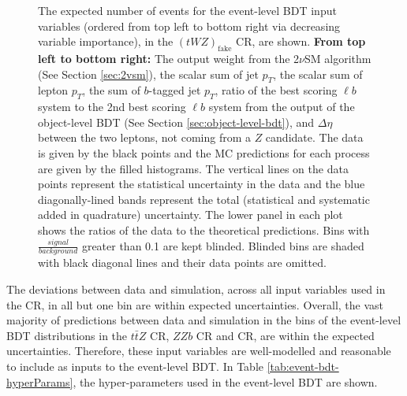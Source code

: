 \begin{figure}[htbp]
\caption{The expected number of events for the event-level BDT input variables (ordered from top left to bottom right via decreasing variable importance), in the $(tWZ)_{\text{fake}}$ CR, are shown. \textbf{From top left to bottom right:} The output weight from the 2$\nu$SM algorithm (See Section \ref{sec:2vsm}), the scalar sum of jet $p_{T}$, the scalar sum of lepton $p_{T}$, the sum of $b$-tagged jet $p_{T}$, ratio of the best scoring $\ell b$ system to the 2nd best scoring $\ell b$ system from the output of the object-level BDT (See Section \ref{sec:object-level-bdt}), and $\Delta \eta$ between the two leptons, not coming from a $Z$ candidate. The data is given by the black points and the MC predictions for each process are given by the filled histograms. The vertical lines on the data points represent the statistical uncertainty in the data and the blue diagonally-lined bands represent the total (statistical and systematic added in quadrature) uncertainty. The lower panel in each plot shows the ratios of the data to the theoretical predictions. Bins with $\frac{signal}{background}$ greater than 0.1 are kept blinded. Blinded bins are shaded with black diagonal lines and their data points are omitted.}
  \label{fig:4lep-tWZfakeCR-eventbdt-vars}
\end{figure}The deviations between data and simulation, across all input variables used in the \tWZfake CR, in all but one bin are within expected uncertainties. Overall, the vast majority of predictions between data and simulation in the bins of the event-level BDT distributions in the $t\bar{t}Z$ CR, $ZZb$ CR and \tWZfake CR, are within the expected uncertainties. Therefore, these input variables are well-modelled and reasonable to include as inputs to the event-level BDT. In Table \ref{tab:event-bdt-hyperParams}, the hyper-parameters used in the event-level BDT are shown.
